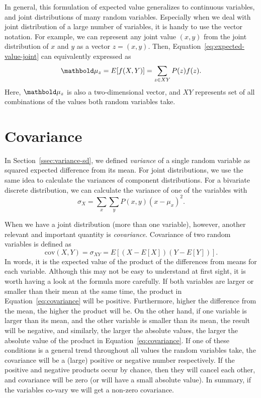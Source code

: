 In general,
this formulation of expected value generalizes to continuous variables,
and joint distributions of many random variables.
Especially when we deal with joint distribution of a large number of variables,
it is handy to use the vector notation.
For example,
we can represent any joint value $(x, y)$
from the joint distribution of $x$ and $y$ as a vector
$z = (x, y)$.
Then, Equation~\ref{eq:expected-value-joint} can equivalently expressed as
\begin{equation}\label{eq:expected-value-joint3}
  \vect{\mu_{z}} = E[f(X,Y)] = \sum_{z\in XY} P(z)f(z) .
\end{equation}
Here, $\vect{\mu_{z}}$ is also a two-dimensional vector,
and $XY$ represents set of all combinations of the values both random variables take.

\section{Covariance}

In Section~\ref{ssec:variance-sd},
we defined \emph{variance} of a single random variable
as squared expected difference from its mean.
For joint distributions,
we use the same idea to calculate
the variances of component distributions. 
For a bivariate discrete distribution,
we can calculate the variance of one of the variables with
\[
  \sigma_{X} = \sum_{x} \sum_{y} P(x,y)(x - \mu_{x})^{2} .
\]

When we have a joint distribution (more than one variable), however, 
another relevant and important quantity is \emph{covariance}.
Covariance of two random variables is defined as 
\begin{equation}\label{eq:covariance}
  \text{cov}(X, Y) = \sigma_{XY} = E[(X - E[X])(Y - E[Y])].
\end{equation}
In words, it is the expected value
of the product of the differences from means for each variable.
Although this may not be easy to understand at first sight,
it is worth having a look at the formula more carefully.
If both variables are larger or smaller than their mean at the same time,
the product in Equation~\ref{eq:covariance} will be positive.
Furthermore,
higher the difference from the mean, the higher the product will be.
On the other hand,
if one variable is larger than its mean,
and the other variable is smaller than its mean,
the result will be negative,
and similarly, the larger the absolute values,
the larger the absolute value of the product in Equation~\ref{eq:covariance}.
If one of these conditions is a general trend
throughout all values the random variables take,
the covariance will be a (large) positive or negative number respectively.
If the positive and negative products occur by chance,
then they will cancel each other, and covariance will be zero
(or will have a small absolute value).
In summary, if the variables co-vary we will get a non-zero covariance.

